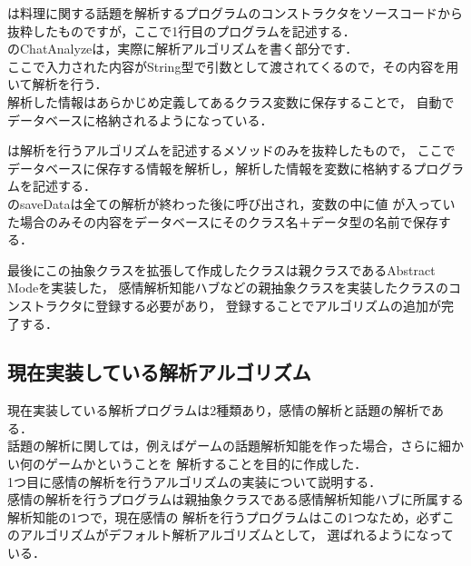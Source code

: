 
は料理に関する話題を解析するプログラムのコンストラクタをソースコードから
抜粋したものですが，ここで1行目のプログラムを記述する．
\\

のChatAnalyzeは，実際に解析アルゴリズムを書く部分です．\\
ここで入力された内容がString型で引数として渡されてくるので，その内容を用いて解析を行う．\\
解析した情報はあらかじめ定義してあるクラス変数に保存することで，
自動でデータベースに格納されるようになっている．

は解析を行うアルゴリズムを記述するメソッドのみを抜粋したもので，
ここでデータベースに保存する情報を解析し，解析した情報を変数に格納するプログラムを記述する．
\\

のsaveDataは全ての解析が終わった後に呼び出され，変数の中に値
が入っていた場合のみその内容をデータベースにそのクラス名＋データ型の名前で保存する．

最後にこの抽象クラスを拡張して作成したクラスは親クラスであるAbstract Modeを実装した，
感情解析知能ハブなどの親抽象クラスを実装したクラスのコンストラクタに登録する必要があり，
登録することでアルゴリズムの追加が完了する．\\

\subsection{現在実装している解析アルゴリズム}
現在実装している解析プログラムは2種類あり，感情の解析と話題の解析である．
\\

話題の解析に関しては，例えばゲームの話題解析知能を作った場合，さらに細かい何のゲームかということを
解析することを目的に作成した．
\\
1つ目に感情の解析を行うアルゴリズムの実装について説明する．
\\

感情の解析を行うプログラムは親抽象クラスである感情解析知能ハブに所属する解析知能の1つで，現在感情の
解析を行うプログラムはこの1つなため，必ずこのアルゴリズムがデフォルト解析アルゴリズムとして，
選ばれるようになっている．
\\


